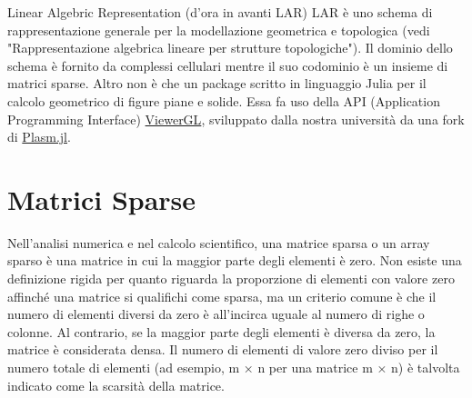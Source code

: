 \documentclass[a4paper]{extreport}
\begin{document}
\begin{multicols*}{2}
Linear Algebric Representation (d'ora in avanti LAR) LAR è uno schema di rappresentazione generale per la modellazione geometrica e topologica (vedi "Rappresentazione algebrica lineare per strutture topologiche"). Il dominio dello schema è fornito da complessi cellulari mentre il suo codominio è un insieme di matrici sparse. Altro non è che un package scritto in linguaggio Julia per il calcolo geometrico di figure piane e solide.
Essa fa uso della API (Application Programming Interface) \href{https://github.com/cvdlab/ViewerGL.jl}{ViewerGL}, sviluppato dalla nostra università da una fork di \href{https://github.com/plasm-language/pyplasm/tree/master/src/plasm.jl}{Plasm.jl}.
\section{Matrici Sparse}
Nell'analisi numerica e nel calcolo scientifico, una matrice sparsa o un array sparso è una matrice in cui la maggior parte degli elementi è zero.  Non esiste una definizione rigida per quanto riguarda la proporzione di elementi con valore zero affinché una matrice si qualifichi come sparsa, ma un criterio comune è che il numero di elementi diversi da zero è all'incirca uguale al numero di righe o colonne. Al contrario, se la maggior parte degli elementi è diversa da zero, la matrice è considerata densa.  Il numero di elementi di valore zero diviso per il numero totale di elementi (ad esempio, m × n per una matrice m × n) è talvolta indicato come la scarsità della matrice.

\end{multicols*}
\end{document}
